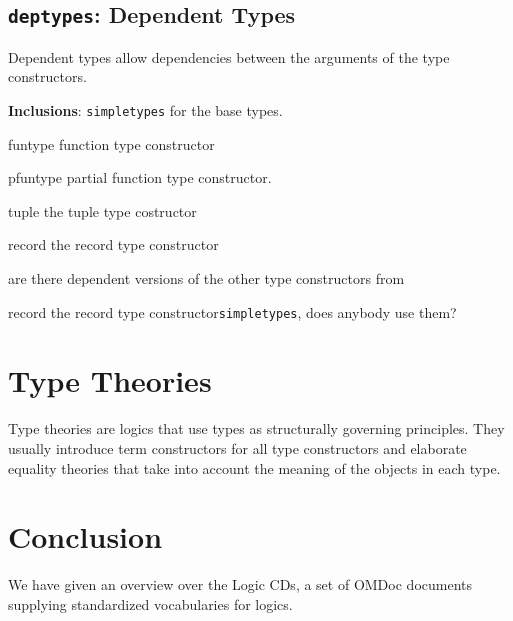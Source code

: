 \documentclass{article}
\def\omdoc{{\sc OMDoc}}
\begin{document}
\subsection{{\tt{deptypes}}: Dependent Types}
Dependent types allow dependencies between the arguments of the type constructors.

{\bf Inclusions}: {\tt{simpletypes}} for the base types. 
\begin{constlist}
  \item[funtype] function type constructor
  \item[pfuntype] partial function type constructor.
  \item[tuple] the tuple type costructor
  \item[record] the record type constructor
\end{constlist}

\begin{todolist}{}
  \item are there dependent versions of the other type constructors from
  \item[record] the record type constructor{\tt{simpletypes}}, does anybody use them?
\end{todolist}

\section{Type Theories}
Type theories are logics that use types as structurally governing principles. They
usually introduce term constructors for all type constructors and elaborate
equality theories that take into account the meaning of the objects in each type.

\section{Conclusion}
We have given an overview over the Logic CDs, a set of {\omdoc} documents
supplying standardized vocabularies for logics. 
\end{document}
